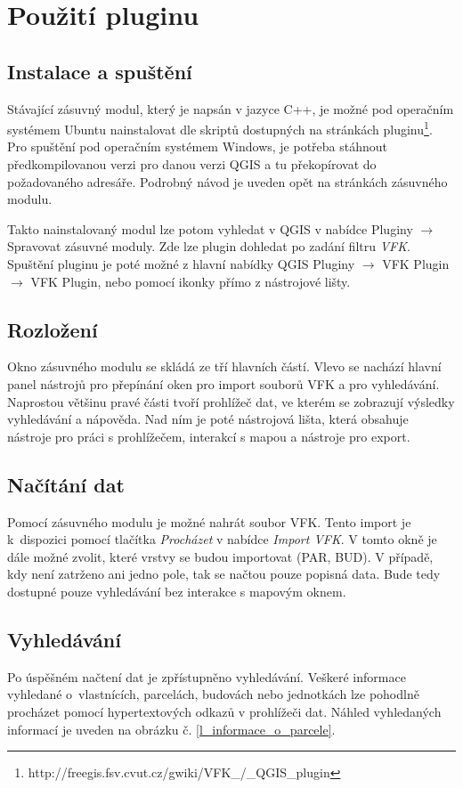 \documentclass[a4paper,12pt,oneside]{book}
\begin{document}
\section{Použití pluginu}

\subsection{Instalace a spuštění}
Stávající zásuvný modul, který je napsán v jazyce C++, je možné pod operačním systémem Ubuntu nainstalovat dle skriptů dostupných na stránkách pluginu\footnote{http://freegis.fsv.cvut.cz/gwiki/VFK\_/\_QGIS\_plugin}. Pro spuštění pod operačním systémem Windows, je potřeba stáhnout předkompilovanou verzi pro danou verzi QGIS a tu překopírovat do požadovaného adresáře. Podrobný návod je uveden opět na stránkách zásuvného modulu. 

Takto nainstalovaný modul lze potom vyhledat v QGIS v nabídce Pluginy $\rightarrow$ Spravovat zásuvné moduly. Zde lze plugin dohledat po zadání filtru \textit{VFK}. Spuštění pluginu je poté možné z hlavní nabídky QGIS Pluginy $\rightarrow$ VFK Plugin $\rightarrow$ VFK Plugin, nebo pomocí ikonky přímo z nástrojové lišty.

\subsection{Rozložení}
Okno zásuvného modulu se skládá ze tří hlavních částí. Vlevo se nachází hlavní panel nástrojů pro přepínání oken pro import souborů VFK a pro vyhledávání. Naprostou většinu pravé části tvoří prohlížeč dat, ve kterém se zobrazují výsledky vyhledávání a nápověda. Nad ním je poté nástrojová lišta, která obsahuje nástroje pro práci s prohlížečem, interakcí s mapou a nástroje pro export. 

\subsection{Načítání dat}
Pomocí zásuvného modulu je možné nahrát soubor VFK. Tento import je k~dispozici pomocí tlačítka \textit{Procházet} v nabídce \textit{Import VFK}. V tomto okně je dále možné zvolit, které vrstvy se budou importovat (PAR, BUD). V případě, kdy není zatrženo ani jedno pole, tak se načtou pouze popisná data. Bude tedy dostupné pouze vyhledávání bez interakce s mapovým oknem. 

\subsection{Vyhledávání}
Po úspěšném načtení dat je zpřístupněno vyhledávání. Veškeré informace vyhledané o~vlastnících, parcelách, budovách nebo jednotkách lze pohodlně procházet pomocí hypertextových odkazů v prohlížeči dat. Náhled vyhledaných informací je uveden na obrázku č. \ref{l_informace_o_parcele}.
\end{document}
